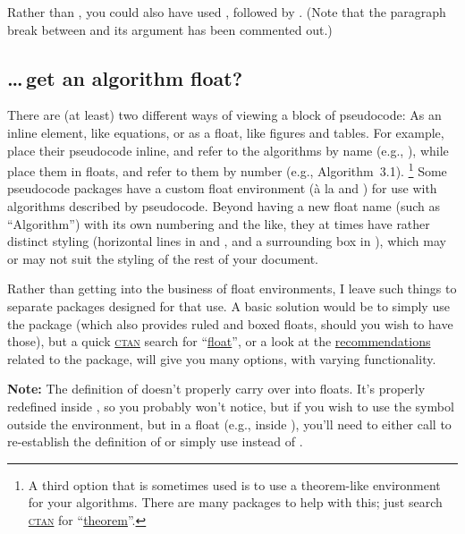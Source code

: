 \documentclass[a4paper]{article}
\def\paragraph#1{\noindent\textbf{#1}\enskip}
\def\refc{\refCom*}
\def\refe{\refEnv*}
\begin{document}
\noindent
Rather than \code{\cs{\bslash}[bol=\cs{midrule}]}, you could also have used
\code{\cs{\bslash}*}, followed by . (Note
that the paragraph break between \refc{\bslash} and its argument has been
commented out.)

\subsection{\dots\,get an algorithm float?}
\label{sec:floats}

There are (at least) two different ways of viewing a block of pseudocode: As
an inline element, like equations, or as a float, like figures and tables. For
example, \citet{Cormen:2009} place their pseudocode inline, and refer to the
algorithms by name (e.g., ), while \citet{Williamson:2011} place
them in floats, and refer to them by number (e.g.,
Algorithm~3.1).%
\footnote{A third option that is sometimes used is to use a theorem-like
environment for your algorithms. There are many packages to help with this;
just search \href{https://ctan.org}{\textsc{ctan}} for
``\href{https://ctan.org/search/?phrase=theorem}{theorem}''.}
%
Some pseudocode packages have a custom float environment (à la 
and ) for use with algorithms described by pseudocode. Beyond
having a new float name (such as ``Algorithm'') with its own numbering and the
like, they at times have rather distinct styling (horizontal lines in
 and
, and a surrounding box
in ), which may or may not
suit the styling of the rest of your document.

Rather than getting into the business of float environments, I leave such
things to separate packages designed for that use. A basic solution would be
to simply use the  package (which also
provides ruled and boxed floats, should you wish to have those), but a quick
\href{https://ctan.org}{\textsc{ctan}} search for
``\href{https://ctan.org/search/?phrase=float}{float}'', or a look at the
\href{https://ctan.org/recommendations/float}{recommendations} related to the
 package, will give you many options,
with varying functionality.
%

\medskip

\paragraph{Note:} The definition of \refc{==} doesn't properly carry over into
floats. It's properly redefined inside \refe{pseudo}, so you probably won't
notice, but if you wish to use the symbol outside the \refe{pseudo}
environment, but in a float (e.g., inside ), you'll need to either
call \refc{pseudoeq} to re-establish the definition of \cs{=} or simply use
\refc{eqs} instead of \refc{==}.
\end{document}
